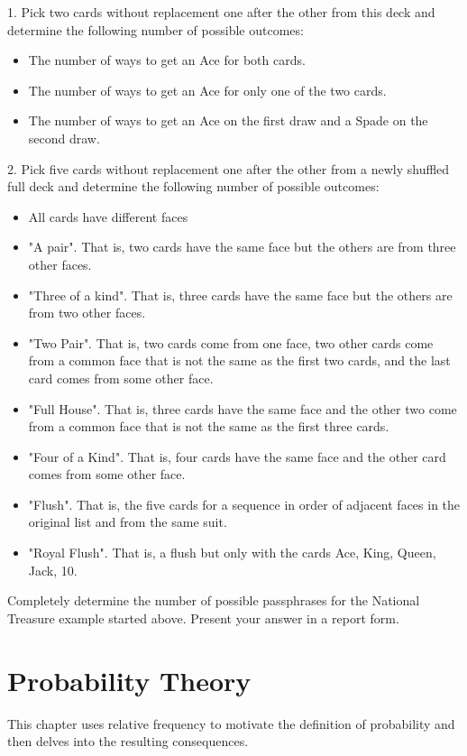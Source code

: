 \documentclass[10pt,]{book}
\theoremstyle{plain}
\theoremstyle{definition}
\theoremstyle{definition}
\theoremstyle{definition}
\numberwithin{equation}{section}
\begin{document}
1.  Pick two cards without replacement one after the other from this deck and determine the following number of possible outcomes:
\leavevmode%
\begin{itemize}[label=\textbullet]
\item{}The number of ways to get an Ace for both cards.%
\item{}The number of ways to get an Ace for only one of the two cards.%
\item{}The number of ways to get an Ace on the first draw and a Spade on the second draw.%
\end{itemize}

2.  Pick five cards without replacement one after the other from a newly shuffled full deck and determine the following number of possible outcomes:
\leavevmode%
\begin{itemize}[label=\textbullet]
\item{}All cards have different faces%
\item{}"A pair". That is, two cards have the same face but the others are from three other faces.%
\item{}"Three of a kind".  That is, three cards have the same face but the others are from two other faces.%
\item{}"Two Pair". That is, two cards come from one face, two other cards come from a common face that is not the same as the first two cards, and the last card comes from some other face.%
\item{}"Full House". That is, three cards have the same face and the other two come from a common face that is not the same as the first three cards.%
\item{}"Four of a Kind". That is, four cards have the same face and the other card comes from some other face.%
\item{}"Flush". That is, the five cards for a sequence in order of adjacent faces in the original list and from the same suit.%
\item{}"Royal Flush". That is, a flush but only with the cards {Ace, King, Queen, Jack, 10}.%
\end{itemize}

%
\par
Completely determine the number of possible passphrases for the National Treasure example started above. Present your answer in a report form.%
\typeout{************************************************}
\typeout{************************************************}
\chapter[Probability Theory]{Probability Theory}\label{ProbabilityGeneralities}
\typeout{************************************************}
\typeout{************************************************}
This chapter uses relative frequency to motivate the definition of probability and then delves into the resulting consequences.%
\typeout{************************************************}
\typeout{************************************************}
\end{document}
